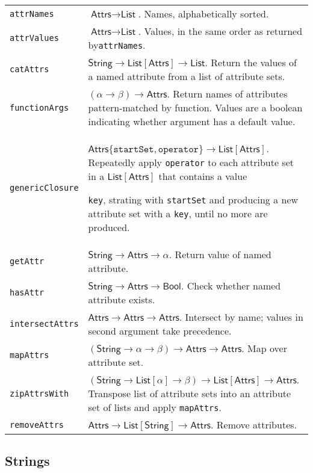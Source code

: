 \documentclass[9pt, a4paper, landscape]{extarticle}
\newcommand{\cmd}[1]{\texttt{#1}}
\newcommand{\str}{\textsf{String}}
\newcommand{\lst}{\textsf{List}}
\newcommand{\ats}{\textsf{Attrs}}
\newcommand{\bln}{\textsf{Bool}}
\begin{document}
\begin{multicols*}{3}
\begin{tabularx}{\columnwidth}{@{}l>{\raggedright\arraybackslash}X@{}}
  \cmd{attrNames} & $\ats \to \lst$. Names, alphabetically sorted. \\

  \cmd{attrValues} & $\ats \to \lst$. Values, in the same order as
  returned by\cmd{attrNames}. \\

  \cmd{catAttrs} & $\str \to \lst[\ats] \to \lst$. Return the values of a
  named attribute from a list of attribute sets. \\

  \cmd{functionArgs} & $(\alpha\to\beta)\to\ats$. Return names of attributes
  pattern-matched by function. Values are a boolean indicating whether
  argument has a default value. \\

  \cmd{genericClosure} & $\ats\{\cmd{startSet},
  \cmd{operator}\}\to\lst[\ats]$. Repeatedly apply \cmd{operator} to
  each attribute set in a $\lst[\ats]$ that contains a value

  \cmd{key}, strating with \cmd{startSet} and producing a new
  attribute set with a \cmd{key}, until no more are produced. \\

  \cmd{getAttr} & $\str\to\ats\to\alpha$. Return value of named attribute. \\

  \cmd{hasAttr} & $\str\to\ats\to\bln$. Check whether named attribute
  exists. \\

  \cmd{intersectAttrs} & $\ats\to\ats\to\ats$. Intersect by name; values
  in second argument take precedence. \\

  \cmd{mapAttrs} & $(\str\to\alpha\to\beta)\to\ats\to\ats$. Map over attribute set. \\

  \cmd{zipAttrsWith} & $(\str\to\lst[\alpha]\to\beta)\to\lst[\ats]\to\ats$. Transpose
  list of attribute sets into an attribute set of lists and apply
  \cmd{mapAttrs}.\\

  \cmd{removeAttrs} & $\ats\to\lst[\str]\to\ats$. Remove attributes. \\

\end{tabularx}


\subsection*{Strings}
\begin{tabularx}{\columnwidth}{@{}l>{\raggedright\arraybackslash}X@{}}


\end{tabularx}
\end{multicols*}
\end{document}
